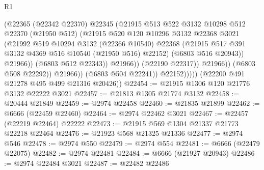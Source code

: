 \begin{lexlean}{R1}
\begin{coremodule}
                                  (@22365
                                    (@22342 @22370)
                                    @22345
                                    (@21915
                                      @513
                                      @522
                                      @3132
                                      @10298
                                      @512
                                      @22370
                                      (@21950 @512)
                                      (@21915
                                        @520
                                        @120
                                        @10296
                                        @3132
                                        @22368
                                        @3021
                                        (@21992
                                          @519
                                          @10294
                                          @3132
                                          (@22366 @10540)
                                          @22368
                                          (@21915
                                            @517
                                            @391
                                            @3132
                                            @4369
                                            @516
                                            @10540
                                            (@21950 @516)
                                            @22152)
                                          (@6803 @516 @20943))
                                        @21966))
                                    (@6803 @512 @22343))
                                  @21966))
                              (@22190 @22317))
                            @21966))
                        (@6803 @508 @22292))
                      @21966))
                  (@6803 @504 @22241))
                @22152)))))
      (@22200 @491 @21278 @495 @499 @21316 @20426))
@22454 := @21915 @1306 @120 @21776 @3132 @22222 @3021
@22457 := @21813 @1305 @21774 @3132
@22458 := @20444 @21849
@22459 := @2974 @22458
@22460 := @21835 @21899
@22462 := @6666 (@22459 @22460)
@22464 := @2974 @22462 @3021
@22467 := @22457 (@22219 @22464) @22222
@22473 := @21915 @569 @1304 @21337 @21773 @22218 @22464
@22476 := @21923 @568 @21325 @21336
@22477 := @2974 @546
@22478 := @2974 @550
@22479 := @2974 @554
@22481 := @6666 (@22479 @22075)
@22482 := @2974 @22481
@22484 := @6666 (@21927 @20943)
@22486 := @2974 @22484 @3021
@22487 := @22482 @22486

\end{coremodule}
\end{lexlean}
